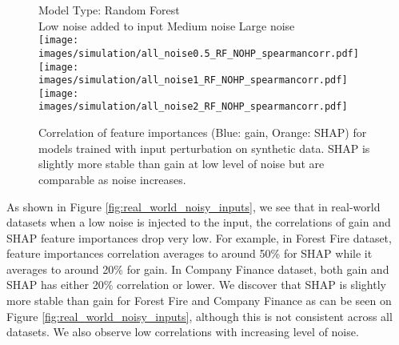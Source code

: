 \begin{figure*}[ht]
    Model Type: Random Forest \\
    Low noise added to input \hspace{1cm} Medium noise \hspace{1.7cm} Large noise \\
    \hspace{10ex}
    \texttt{[image: images/simulation/all\_noise0.5\_RF\_NOHP\_spearmancorr.pdf]}
    \texttt{[image: images/simulation/all\_noise1\_RF\_NOHP\_spearmancorr.pdf]}
    \texttt{[image: images/simulation/all\_noise2\_RF\_NOHP\_spearmancorr.pdf]}
  \caption{Correlation of feature importances (Blue: gain, Orange: SHAP) for models trained with input perturbation on synthetic data. SHAP is slightly more stable than gain at low level of noise but are comparable as noise increases.}
  \label{fig:all_perturbed_input}
\end{figure*}



As shown in Figure \ref{fig:real_world_noisy_inputs}, we see that in real-world datasets when a low noise is injected to the input, the correlations of gain and SHAP feature importances drop very low. For example, in Forest Fire dataset, feature importances correlation averages to around 50\% for SHAP while it averages to around 20\% for gain. In Company Finance dataset, both gain and SHAP has either 20\% correlation or lower. We discover that SHAP is slightly more stable than gain for Forest Fire and Company Finance as can be seen on Figure \ref{fig:real_world_noisy_inputs}, although this is not consistent across all datasets. We also observe low correlations with increasing level of noise.  


